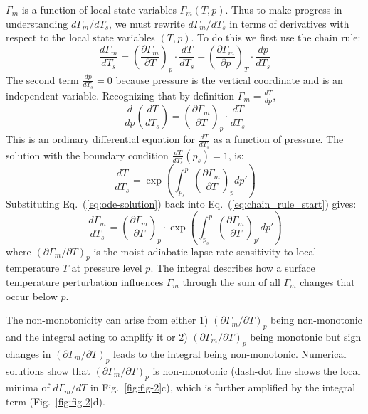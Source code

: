 \documentclass[draft]{ametsocV6.1}
\begin{document}
$\Gamma_m$ is a function of local state variables $\Gamma_m(T, p)$. Thus to make progress in understanding $d\Gamma_m/dT_s$, we must rewrite $d\Gamma_m/dT_s$ in terms of derivatives with respect to the local state variables $(T, p)$. To do this we first use the chain rule: 
\begin{equation}
\frac{d\Gamma_m}{dT_s} = \left(\frac{\partial\Gamma_m}{\partial T}\right)_p \cdot \frac{dT}{dT_s} + \left(\frac{\partial\Gamma_m}{\partial p}\right)_T \cdot \frac{dp}{dT_s} \label{eq:chain_rule_start}
\end{equation}
The second term $\frac{dp}{dT_s}=0$ because pressure is the vertical coordinate and is an independent variable. Recognizing that by definition $\Gamma_m = \frac{dT}{dp}$,
\begin{equation}
    \frac{d}{dp}\left(\frac{dT}{dT_s}\right) = \left(\frac{\partial\Gamma_m}{\partial T}\right)_p \cdot \frac{dT}{dT_s} 
    \label{eq:ode}
\end{equation}
This is an ordinary differential equation for $\frac{dT}{dT_s}$ as a function of pressure. The solution with the boundary condition $\frac{dT}{dT_s}(p_s) = 1$, is:
\begin{equation}
    \frac{dT}{dT_s} = \exp\left(\int_{p_s}^{p} \left(\frac{\partial\Gamma_m}{\partial T}\right)_p dp'\right)
    \label{eq:ode-solution}
\end{equation}
Substituting Eq.~(\ref{eq:ode-solution}) back into Eq.~(\ref{eq:chain_rule_start}) gives:
\begin{equation}
\frac{d\Gamma_m}{dT_s} = \left(\frac{\partial\Gamma_m}{\partial T}\right)_p \cdot \exp\left(\int_{p_s}^{p} \left(\frac{\partial\Gamma_m}{\partial T}\right)_{p'} dp'\right) \label{eq:total_sensitivity}
\end{equation}
where $(\partial\Gamma_m/\partial T)_p$ is the moist adiabatic lapse rate sensitivity to local temperature $T$ at pressure level $p$. The integral describes how a surface temperature perturbation influences $\Gamma_m$ through the sum of all $\Gamma_m$ changes that occur below $p$.

The non-monotonicity can arise from either 1) $(\partial\Gamma_m/\partial T)_p$ being non-monotonic and the integral acting to amplify it or 2) $(\partial\Gamma_m/\partial T)_p$ being monotonic but sign changes in $(\partial\Gamma_m/\partial T)_p$ leads to the integral being non-monotonic. Numerical solutions show that $(\partial\Gamma_m/\partial T)_p$ is non-monotonic (dash-dot line shows the local minima of $d\Gamma_m/dT$ in Fig.~\ref{fig:fig-2}c), which is further amplified by the integral term (Fig.~\ref{fig:fig-2}d).
\end{document}
